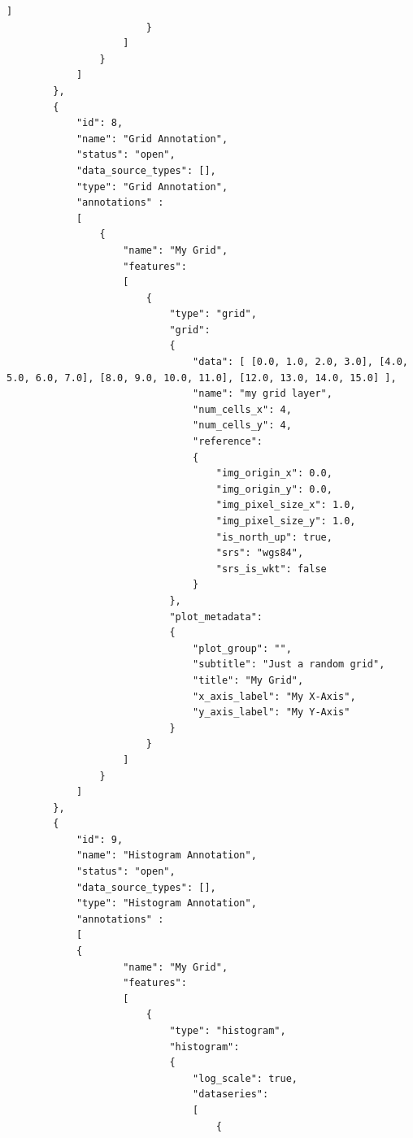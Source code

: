 \begin{lstlisting}[basicstyle=\small\ttfamily]
                            ]
                        }
                    ]
                }                
            ]
        },
        {
            "id": 8,
            "name": "Grid Annotation",
            "status": "open",
            "data_source_types": [],
            "type": "Grid Annotation",
            "annotations" :
            [
                {
                    "name": "My Grid",
                    "features":
                    [
                        {
                            "type": "grid",
                            "grid": 
                            {
                                "data": [ [0.0, 1.0, 2.0, 3.0], [4.0, 5.0, 6.0, 7.0], [8.0, 9.0, 10.0, 11.0], [12.0, 13.0, 14.0, 15.0] ],
                                "name": "my grid layer",
                                "num_cells_x": 4,
                                "num_cells_y": 4,
                                "reference": 
                                {
                                    "img_origin_x": 0.0,     
                                    "img_origin_y": 0.0,     
                                    "img_pixel_size_x": 1.0, 
                                    "img_pixel_size_y": 1.0, 
                                    "is_north_up": true,    
                                    "srs": "wgs84",        
                                    "srs_is_wkt": false  
                                }
                            },
                            "plot_metadata": 
                            {
                                "plot_group": "",
                                "subtitle": "Just a random grid",
                                "title": "My Grid",
                                "x_axis_label": "My X-Axis",
                                "y_axis_label": "My Y-Axis"
                            }
                        }                
                    ]
                }
            ]
        },
        {
            "id": 9,
            "name": "Histogram Annotation",
            "status": "open",
            "data_source_types": [],
            "type": "Histogram Annotation",
            "annotations" :
            [
            {
                    "name": "My Grid",
                    "features":
                    [
                        {
                            "type": "histogram",
                            "histogram": 
                            {
                                "log_scale": true,
                                "dataseries": 
                                [
                                    {

\end{lstlisting}
